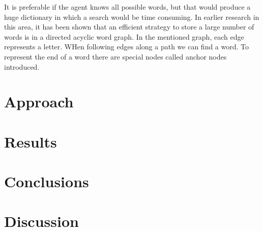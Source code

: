 \documentclass[a4paper, 12pt]{report}
\begin{document}
It is preferable if the agent knows all possible words, but that would produce a huge dictionary in which a search would be time consuming. In earlier research in this area, it has been shown that an efficient strategy to store a large number of words is in a directed acyclic word graph. In the mentioned graph, each edge represents a letter. WHen following edges along a path we can find a word. To represent the end of a word there are special nodes called anchor nodes introduced.
\chapter{Approach}
\chapter{Results}
\chapter{Conclusions}
\chapter{Discussion}
\end{document}
